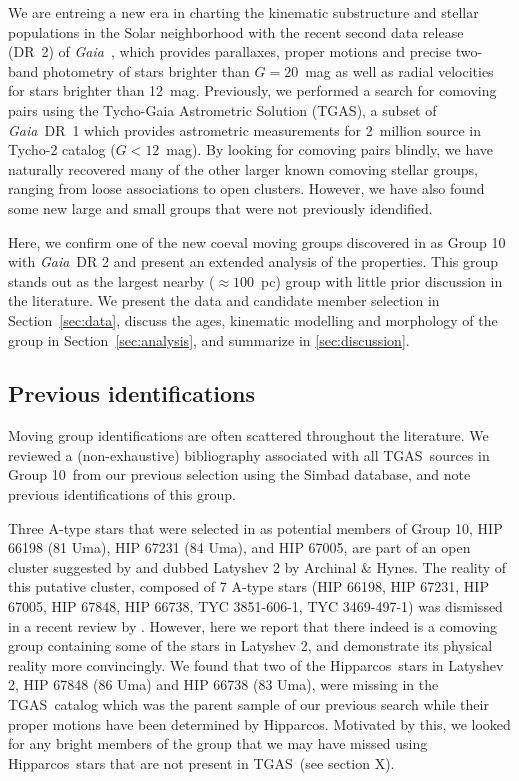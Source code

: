 \documentclass[modern,letterpaper]{aastex61}
\newcommand{\project}[1]{\textsl{#1}}
\newcommand{\acronym}[1]{{\small{#1}}}
\newcommand{\hipparcos}{Hipparcos}
\newcommand{\gaia}{\project{Gaia}}
\newcommand{\sectionname}{Section}
\newcommand{\tgas}{\acronym{TGAS}}
\newcommand{\groupTen}{Group 10}
\newcommand{\todo}[1]{{\color{crimson}#1}}
\begin{document}
We are entreing a new era in charting the kinematic substructure and stellar
populations in the Solar neighborhood with the recent second data release (DR~2)
of \gaia\ \citep{2018arXiv180409365G}, which provides parallaxes, proper motions
and precise two-band photometry of stars brighter than $G=20$~mag as well as
radial velocities for stars brighter than 12~mag.
Previously, we performed a search for comoving pairs using the Tycho-Gaia
Astrometric Solution (\tgas), a subset of \gaia\ DR~1 which provides astrometric
measurements for 2~million source in Tycho-2 catalog ($G<12$~mag).
By looking for comoving pairs blindly, we have naturally recovered
many of the other larger known comoving stellar groups, ranging from
loose associations to open clusters.
However, we have also found some new large and small groups that
were not previously idendified.

Here, we confirm one of the new coeval moving groups
discovered in \citet{2017AJ....153..257O} as Group 10
with \gaia\ DR 2 and present an extended analysis of the properties.
This group stands out as the largest nearby ($\approx 100$~pc) group with little
prior discussion in the literature.
We present the data and candidate member selection in
\sectionname~\ref{sec:data}, discuss the ages, kinematic modelling and
morphology of the group in \sectionname~\ref{sec:analysis},
and summarize in \ref{sec:discussion}.


\subsection{Previous identifications}
\label{subsec:history}

Moving group identifications are often scattered throughout the literature. We
reviewed a (non-exhaustive) bibliography associated with all \tgas\ sources in
\groupTen\ from our previous selection \citep{2017AJ....153..257O} using the
Simbad database, and note previous identifications of this group.

Three A-type stars that were selected in \citet{2017AJ....153..257O} as potential
members of \groupTen,
HIP 66198 (81 Uma), HIP 67231 (84 Uma), and HIP 67005, are part of an open cluster
suggested by \citet{1977ATsir.969....7L} and dubbed Latyshev 2 by Archinal \& Hynes.
The reality of this putative cluster, composed of 7 A-type stars
(HIP 66198,
HIP 67231,
HIP 67005,
HIP 67848,
HIP 66738,
TYC 3851-606-1,
TYC 3469-497-1)
was dismissed in a recent review by \citet{2016IAUS..314...21M}.
However, here we report that there indeed is a comoving group containing
some of the stars in Latyshev 2, and demonstrate
its physical reality more convincingly.
%
We found that two of the \hipparcos\ stars in Latyshev 2,
HIP 67848 (86 Uma) and HIP 66738 (83 Uma),
were missing in the \tgas\ catalog which was the parent sample of our previous search while
their proper motions have been determined by \hipparcos.
Motivated by this, we looked for any bright members of the group that we may
have missed using \hipparcos\ stars that are not present in \tgas\ (\todo{see
section X}).
\end{document}
